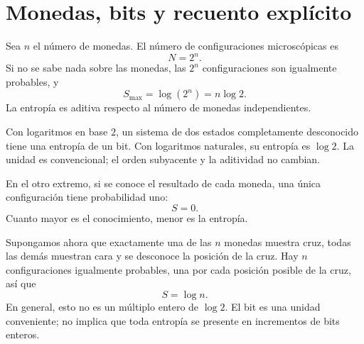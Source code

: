 \section{Monedas, bits y recuento explícito}

Sea \(n\) el número de monedas. El número de configuraciones microscópicas es
\begin{equation}
 N=2^n.
 \label{eq:sm1-coin-state-count}
\end{equation}
Si no se sabe nada sobre las monedas, las \(2^n\) configuraciones son igualmente probables, y
\begin{equation}
 S_{\max}=\log(2^n)=n\log2.
 \label{eq:sm1-coin-max-entropy}
\end{equation}
La entropía es aditiva respecto al número de monedas independientes.

Con logaritmos en base \(2\), un sistema de dos estados completamente desconocido tiene una entropía de un bit. Con logaritmos naturales, su entropía es \(\log2\). La unidad es convencional; el orden subyacente y la aditividad no cambian.

En el otro extremo, si se conoce el resultado de cada moneda, una única configuración tiene probabilidad uno:
\begin{equation}
 S=0.
\end{equation}
Cuanto mayor es el conocimiento, menor es la entropía.

Supongamos ahora que exactamente una de las \(n\) monedas muestra cruz, todas las demás muestran cara y se desconoce la posición de la cruz. Hay \(n\) configuraciones igualmente probables, una por cada posición posible de la cruz, así que
\begin{equation}
 S=\log n.
 \label{eq:sm1-one-tail-entropy}
\end{equation}
En general, esto no es un múltiplo entero de \(\log2\). El bit es una unidad conveniente; no implica que toda entropía se presente en incrementos de bits enteros.

\begin{classroomqa}
\end{classroomqa}

